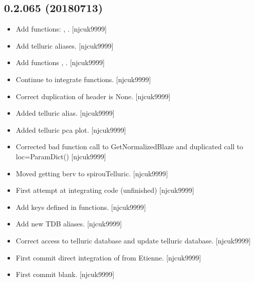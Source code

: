 \documentclass[a4paper,10pt,english]{report}
\begin{document}
\subsection{0.2.065 (2018\sphinxhyphen{}07\sphinxhyphen{}13)}
\label{\detokenize{misc/changelog:id412}}\begin{itemize}
\item {} 
Add functions: , . {[}njcuk9999{]}

\item {} 
Add telluric aliases. {[}njcuk9999{]}

\item {} 
Add functions , .
{[}njcuk9999{]}

\item {} 
Continue to integrate functions. {[}njcuk9999{]}

\item {} 
Correct duplication of header is None. {[}njcuk9999{]}

\item {} 
Added telluric alias. {[}njcuk9999{]}

\item {} 
Added telluric pca plot. {[}njcuk9999{]}

\item {} 
Corrected bad function call to GetNormalizedBlaze and duplicated call
to loc=ParamDict() {[}njcuk9999{]}

\item {} 
Moved getting berv to spirouTelluric. {[}njcuk9999{]}

\item {} 
First attempt at integrating code (unfinished) {[}njcuk9999{]}

\item {} 
Add keys defined in functions. {[}njcuk9999{]}

\item {} 
Add new TDB aliases. {[}njcuk9999{]}

\item {} 
Correct access to telluric database and update telluric database.
{[}njcuk9999{]}

\item {} 
First commit \sphinxhyphen{} direct integration of  from Etienne.
{[}njcuk9999{]}

\item {} 
First commit \sphinxhyphen{} blank. {[}njcuk9999{]}


\end{itemize}
\end{document}
